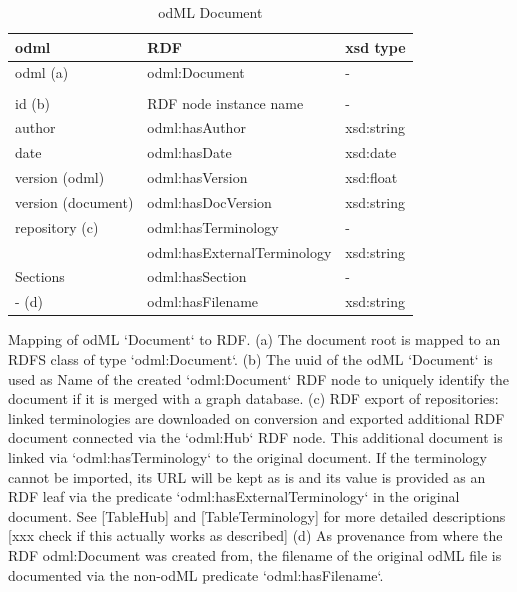 \documentclass{article}
\begin{document}
\begin{table}
\begin{threeparttable}
\caption{odML Document}
\begin{tabular}{l|l|l}
    odml                    & RDF                                 & xsd type \\
\hline
    odml (a)                & odml:Document                       & - \\
                            & & \\
    id (b)                  & RDF node instance name              & - \\
    author                  & odml:hasAuthor                      & xsd:string \\
    date                    & odml:hasDate                        & xsd:date \\
    version (odml)          & odml:hasVersion                     & xsd:float \\
    version (document)      & odml:hasDocVersion                  & xsd:string \\
    repository (c)          & odml:hasTerminology                 & - \\
                            & odml:hasExternalTerminology         & xsd:string \\
    Sections                & odml:hasSection                     & - \\
    - (d)                   & odml:hasFilename                    & xsd:string \\
\end{tabular}
\begin{tablenotes}
\small
\item Mapping of odML `Document` to RDF. (a) The document root is mapped to an RDFS class of type `odml:Document`. (b) The uuid of the odML `Document` is used as Name of the created `odml:Document` RDF node to uniquely identify the document if it is merged with a graph database. (c) RDF export of repositories: linked terminologies are downloaded on conversion and exported additional RDF document connected via the `odml:Hub` RDF node. This additional document is linked via `odml:hasTerminology` to the original document. If the terminology cannot be imported, its URL will be kept as is and its value is provided as an RDF leaf via the predicate `odml:hasExternalTerminology` in the original document. See [TableHub] and [TableTerminology] for more detailed descriptions [xxx check if this actually works as described] (d) As provenance from where the RDF odml:Document was created from, the filename of the original odML file is documented via the non-odML predicate `odml:hasFilename`.
\end{tablenotes}
\end{threeparttable}
\end{table}
\end{document}
